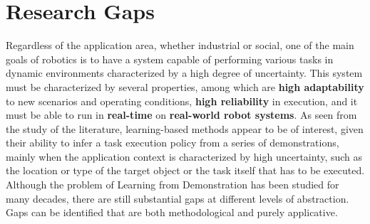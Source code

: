 \section{Research Gaps}
\label{sec:research_gaps}
Regardless of the application area, whether industrial or social, one of the main goals of robotics is to have a system capable of performing various tasks in dynamic environments characterized by a high degree of uncertainty. This system must be characterized by several properties, among which are \textbf{high adaptability} to new scenarios and operating conditions, \textbf{high reliability} in execution, and it must be able to run in \textbf{real-time} on \textbf{real-world robot systems}. As seen from the study of the literature, learning-based methods appear to be of interest, given their ability to infer a task execution policy from a series of demonstrations, mainly when the application context is characterized by high uncertainty, such as the location or type of the target object or the task itself that has to be executed. Although the problem of Learning from Demonstration has been studied for many decades, there are still substantial gaps at different levels of abstraction. Gaps can be identified that are both methodological and purely applicative.

